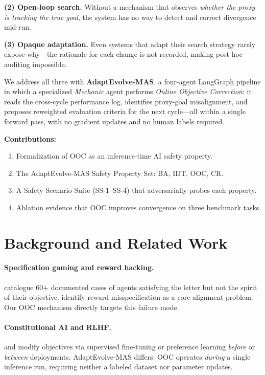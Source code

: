 \documentclass[letterpaper]{article}
\begin{document}
\textbf{(2) Open-loop search.} Without a mechanism that observes
\emph{whether the proxy is tracking the true goal}, the system has no
way to detect and correct divergence mid-run.

\textbf{(3) Opaque adaptation.} Even systems that adapt their search
strategy rarely expose why---the rationale for each change is not
recorded, making post-hoc auditing impossible.

We address all three with \textbf{AdaptEvolve-MAS}, a four-agent LangGraph
pipeline in which a specialized \emph{Mechanic} agent performs
\emph{Online Objective Correction}: it reads the cross-cycle performance
log, identifies proxy-goal misalignment, and proposes reweighted
evaluation criteria for the next cycle---all within a single forward
pass, with no gradient updates and no human labels required.

\noindent\textbf{Contributions:}
\begin{enumerate}
  \item Formalization of OOC as an inference-time AI safety property.
  \item The AdaptEvolve-MAS Safety Property Set: BA, IDT, OOC, CR.
  \item A Safety Scenario Suite (SS-1--SS-4) that adversarially probes each property.
  \item Ablation evidence that OOC improves convergence on three benchmark tasks.
\end{enumerate}

\section{Background and Related Work}

\paragraph{Specification gaming and reward hacking.}
\citet{krakovna2020} catalogue 60+ documented cases of agents satisfying
the letter but not the spirit of their objective.
\citet{amodei2016} identify reward misspecification as a core alignment
problem.  Our OOC mechanism directly targets this failure mode.

\paragraph{Constitutional AI and RLHF.}
\citet{bai2022} and \citet{ouyang2022} modify objectives via supervised
fine-tuning or preference learning \emph{before} or \emph{between}
deployments.  AdaptEvolve-MAS differs: OOC operates \emph{during} a single
inference run, requiring neither a labeled dataset nor parameter updates.
\end{document}
